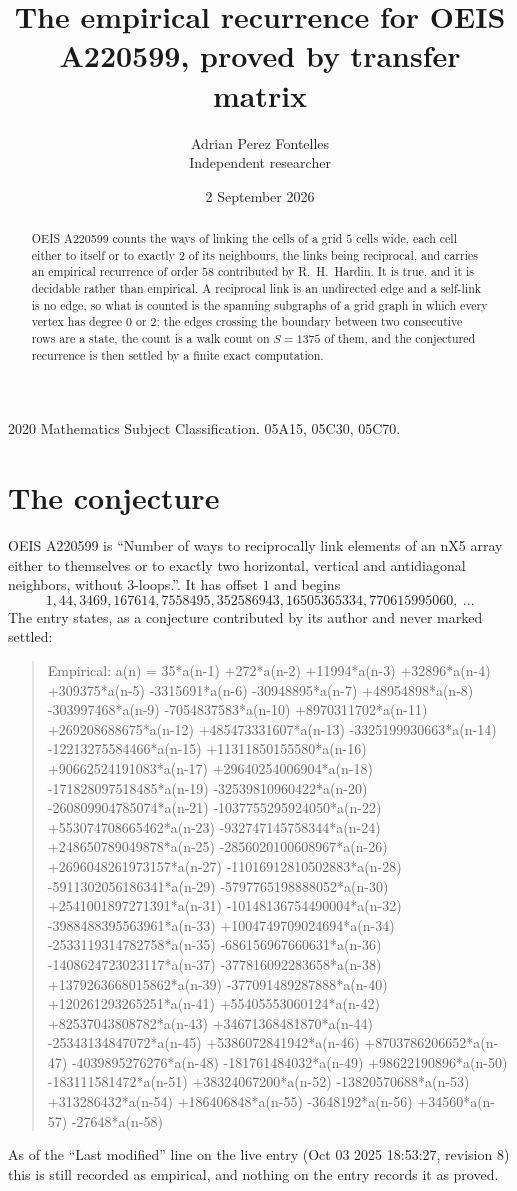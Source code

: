 \documentclass[11pt,a4paper]{article}
\title{The empirical recurrence for OEIS A220599, proved by transfer matrix}
\author{Adrian Perez Fontelles\\ \small Independent researcher}
\date{2 September 2026}
\theoremstyle{plain}
\theoremstyle{definition}
\begin{document}
\maketitle

\begin{abstract}
OEIS A220599 counts the ways of linking the cells of a grid $5$ cells wide, each cell either to
itself or to exactly $2$ of its neighbours, the links being reciprocal, and carries an
empirical recurrence of order $58$ contributed by R.~H.~Hardin. It is true, and it is
decidable rather than empirical. A reciprocal link is an undirected edge and a self-link is
no edge, so what is counted is the spanning subgraphs of a grid graph in which every vertex
has degree $0$ or $2$; the edges crossing the boundary between two consecutive rows are a
state, the count is a walk count on $S=1375$ of them, and the conjectured recurrence is then
settled by a finite exact computation.
\end{abstract}

\noindent\small 2020 Mathematics Subject Classification. 05A15, 05C30, 05C70.\normalsize

\section{The conjecture}

OEIS A220599 is ``Number of ways to reciprocally link elements of an nX5 array either to themselves or to exactly two horizontal, vertical and antidiagonal neighbors, without 3-loops.''. It has offset $1$ and begins
\[
1, 44, 3469, 167614, 7558495, 352586943, 16505365334, 770615995060,\ \dots
\]
The entry states, as a conjecture contributed by its author and never marked settled:
\begin{quote}
Empirical: a(n) = 35*a(n-1) +272*a(n-2) +11994*a(n-3) +32896*a(n-4) +309375*a(n-5) -3315691*a(n-6) -30948895*a(n-7) +48954898*a(n-8) -303997468*a(n-9) -7054837583*a(n-10) +8970311702*a(n-11) +269208688675*a(n-12) +485473331607*a(n-13) -3325199930663*a(n-14) -12213275584466*a(n-15) +11311850155580*a(n-16) +90662524191083*a(n-17) +29640254006904*a(n-18) -171828097518485*a(n-19) -32539810960422*a(n-20) -260809904785074*a(n-21) -1037755295924050*a(n-22) +553074708665462*a(n-23) -932747145758344*a(n-24) +248650789049878*a(n-25) -2856020100608967*a(n-26) +2696048261973157*a(n-27) -11016912810502883*a(n-28) -5911302056186341*a(n-29) -5797765198888052*a(n-30) +2541001897271391*a(n-31) -10148136754490004*a(n-32) -3988488395563961*a(n-33) +1004749709024694*a(n-34) -2533119314782758*a(n-35) -686156967660631*a(n-36) -1408624723023117*a(n-37) -377816092283658*a(n-38) +1379263668015862*a(n-39) -377091489287888*a(n-40) +120261293265251*a(n-41) +55405553060124*a(n-42) +82537043808782*a(n-43) +34671368481870*a(n-44) -25343134847072*a(n-45) +5386072841942*a(n-46) +8703786206652*a(n-47) -4039895276276*a(n-48) -181761484032*a(n-49) +98622190896*a(n-50) -183111581472*a(n-51) +38324067200*a(n-52) -13820570688*a(n-53) +313286432*a(n-54) +186406848*a(n-55) -3648192*a(n-56) +34560*a(n-57) -27648*a(n-58)
\end{quote}
As of the ``Last modified'' line on the live entry (Oct 03 2025 18:53:27, revision 8) this is still
recorded as empirical, and nothing on the entry records it as proved.
\end{document}
